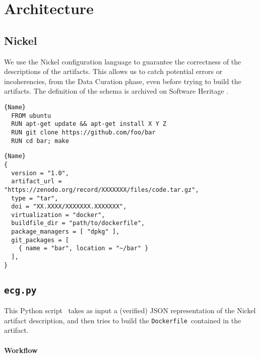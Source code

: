 \documentclass{article}
\newcommand{\dfile}{\texttt{Dockerfile}}
\newcommand{\ecg}{\texttt{ecg.py}}
\begin{document}
\cite{acmrep24}

\section{Architecture}

\subsection{Nickel}\label{sec:nickel}

We use the Nickel configuration language to guarantee the correctness of the descriptions of the artifacts.
This allows us to catch potential errors or incoherencies, from the Data Curation phase, even before trying to build the artifacts.
The definition of the schema is archived on Software Heritage \cite{nickel_schema}.

\noindent\begin{minipage}{.49\textwidth}
\begin{lstlisting}[caption=\dfile]{Name}
  FROM ubuntu
  RUN apt-get update && apt-get install X Y Z
  RUN git clone https://github.com/foo/bar
  RUN cd bar; make
\end{lstlisting}
\end{minipage}
\hfill
\begin{minipage}{.49\textwidth}
\begin{lstlisting}[caption=Nickel]{Name}
{
  version = "1.0",
  artifact_url = "https://zenodo.org/record/XXXXXXX/files/code.tar.gz",
  type = "tar",
  doi = "XX.XXXX/XXXXXXX.XXXXXXX",
  virtualization = "docker",
  buildfile_dir = "path/to/dockerfile",
  package_managers = [ "dpkg" ],
  git_packages = [
    { name = "bar", location = "~/bar" }
  ],
}
\end{lstlisting}
\end{minipage}

\subsection{\ecg}

This Python script\ \cite{ecg_code} takes as input a (verified) JSON representation of the Nickel artifact description, and then tries to build the \dfile\ contained in the artifact.

\paragraph{Workflow}
\end{document}
